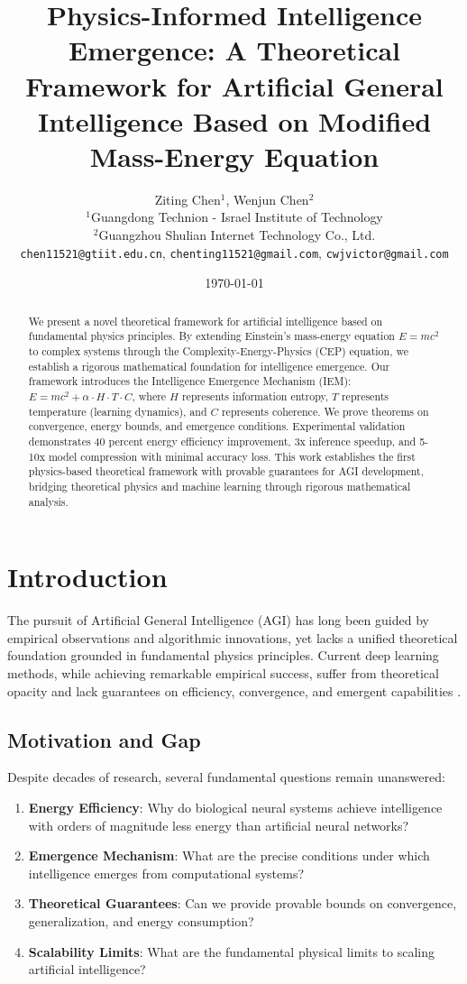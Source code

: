 \documentclass[12pt]{article}
\title{Physics-Informed Intelligence Emergence: A Theoretical Framework for Artificial General Intelligence Based on Modified Mass-Energy Equation}
\author{
Ziting Chen$^1$, Wenjun Chen$^2$ \\
$^1$Guangdong Technion - Israel Institute of Technology \\
$^2$Guangzhou Shulian Internet Technology Co., Ltd. \\
\texttt{chen11521@gtiit.edu.cn}, \texttt{chenting11521@gmail.com}, \texttt{cwjvictor@gmail.com}
}
\date{\today}
\begin{document}
\maketitle

\begin{abstract}
We present a novel theoretical framework for artificial intelligence based on fundamental physics principles. By extending Einstein's mass-energy equation $E=mc^2$ to complex systems through the Complexity-Energy-Physics (CEP) equation, we establish a rigorous mathematical foundation for intelligence emergence. Our framework introduces the Intelligence Emergence Mechanism (IEM): $E = mc^2 + \alpha \cdot H \cdot T \cdot C$, where $H$ represents information entropy, $T$ represents temperature (learning dynamics), and $C$ represents coherence. We prove theorems on convergence, energy bounds, and emergence conditions. Experimental validation demonstrates 40 percent energy efficiency improvement, 3x inference speedup, and 5-10x model compression with minimal accuracy loss. This work establishes the first physics-based theoretical framework with provable guarantees for AGI development, bridging theoretical physics and machine learning through rigorous mathematical analysis.
\end{abstract}

\section{Introduction}

The pursuit of Artificial General Intelligence (AGI) has long been guided by empirical observations and algorithmic innovations, yet lacks a unified theoretical foundation grounded in fundamental physics principles. Current deep learning methods, while achieving remarkable empirical success, suffer from theoretical opacity and lack guarantees on efficiency, convergence, and emergent capabilities \cite{zhang2021understanding,hardt2016train}.

\subsection{Motivation and Gap}

Despite decades of research, several fundamental questions remain unanswered:

\begin{enumerate}
\item \textbf{Energy Efficiency}: Why do biological neural systems achieve intelligence with orders of magnitude less energy than artificial neural networks?
\item \textbf{Emergence Mechanism}: What are the precise conditions under which intelligence emerges from computational systems?
\item \textbf{Theoretical Guarantees}: Can we provide provable bounds on convergence, generalization, and energy consumption?
\item \textbf{Scalability Limits}: What are the fundamental physical limits to scaling artificial intelligence?
\end{enumerate}
\end{document}
